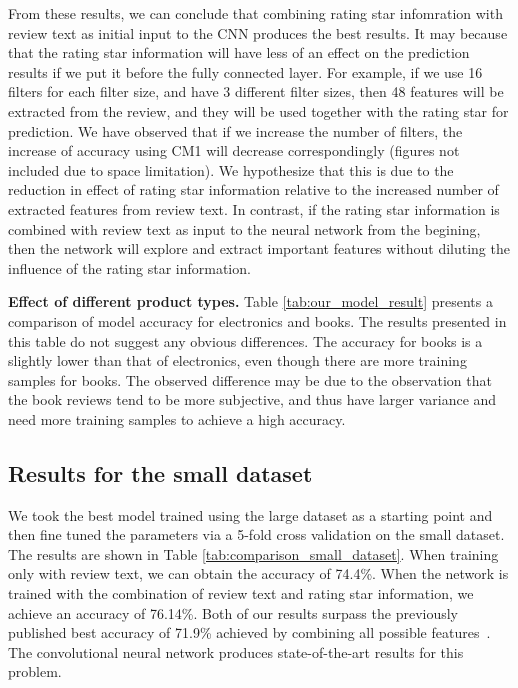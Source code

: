 \documentclass[conference,compsoc]{IEEEtran}
\begin{document}
From these results, we can conclude that combining rating star infomration with review text as initial input to the CNN produces the best results. It may because that the rating star information will have less of an effect on the prediction results if we put it before the fully connected layer. For example, if we use 16 filters for each filter size, and have 3 different filter sizes, then 48 features will be extracted from the review, and they will be used together with the rating star for prediction. We have observed that if we increase the number of filters, the increase of accuracy using CM1 will decrease correspondingly (figures not included due to space limitation). We hypothesize that this is due to the reduction in effect of rating star information relative to the increased number of extracted features from review text. In contrast, if the rating star information is combined with review text as input to the neural network from the begining, then the network will explore and extract important features without diluting the influence of the rating star information.

\textbf{Effect of different product types.} Table \ref{tab:our_model_result} presents a comparison of model accuracy for electronics and books. The results presented in this table do not suggest any obvious differences. The accuracy for books is a slightly lower than that of electronics, even though there are more training samples for books. The observed difference may be due to the observation that the book reviews tend to be more subjective, and thus have larger variance and need more training samples to achieve a high accuracy.

\subsection{Results for the small dataset}%
We took the best model trained using the large dataset as a starting point and then fine tuned the parameters via a 5-fold cross validation on the small dataset. The results are shown in Table \ref{tab:comparison_small_dataset}. When training only with review text, we can obtain the accuracy of 74.4\%. When the network is trained with the combination of review text and rating star information, we achieve an accuracy of 76.14\%. Both of our results surpass the previously published best accuracy of 71.9\% achieved by combining all possible features~\cite{Hong_2012}. The convolutional neural network produces state-of-the-art results for this problem.
\end{document}
